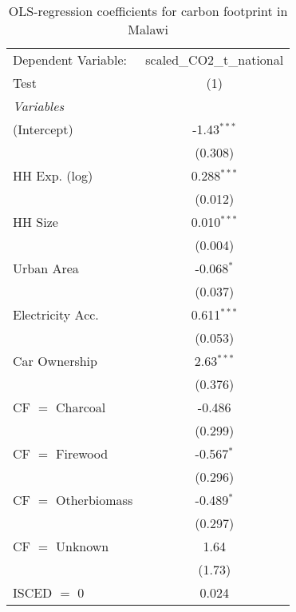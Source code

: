 
\begin{table}[htbp!]
   \centering
   \small
   \begin{adjustbox}{width = 1\textwidth, max height = 0.95\textheight, center}
      \begin{threeparttable}[b]
         \caption{\label{tab:OLS_2_MWI} OLS-regression coefficients for carbon footprint in Malawi}
         \begin{tabular}{lc}
            \tabularnewline \midrule \midrule
            Dependent Variable: & scaled\_CO2\_t\_national\\     
            Test                & (1)\\  
            \midrule
            \emph{Variables}\\
            (Intercept)         & -1.43$^{***}$\\   
                                & (0.308)\\   
            HH Exp. (log)       & 0.288$^{***}$\\   
                                & (0.012)\\   
            HH Size             & 0.010$^{***}$\\   
                                & (0.004)\\   
            Urban Area          & -0.068$^{*}$\\   
                                & (0.037)\\   
            Electricity Acc.    & 0.611$^{***}$\\   
                                & (0.053)\\   
            Car Ownership       & 2.63$^{***}$\\   
                                & (0.376)\\   
            CF $=$ Charcoal     & -0.486\\   
                                & (0.299)\\   
            CF $=$ Firewood     & -0.567$^{*}$\\   
                                & (0.296)\\   
            CF $=$ Otherbiomass & -0.489$^{*}$\\   
                                & (0.297)\\   
            CF $=$ Unknown      & 1.64\\   
                                & (1.73)\\   
            ISCED $=$ 0         & 0.024\\   

\end{tabular}
\end{threeparttable}
\end{adjustbox}
\end{table}
